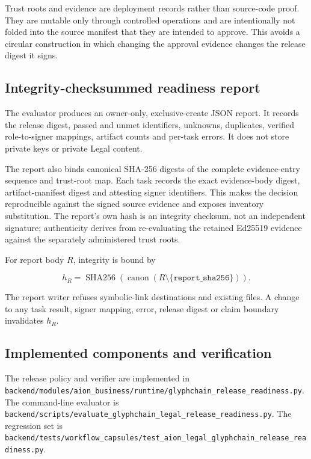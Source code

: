Trust roots and evidence are deployment records rather than source-code proof.
They are mutable only through controlled operations and are intentionally not
folded into the source manifest that they are intended to approve.  This avoids
a circular construction in which changing the approval evidence changes the
release digest it signs.

\subsection{Integrity-checksummed readiness report}

The evaluator produces an owner-only, exclusive-create JSON report.  It records
the release digest, passed and unmet identifiers, unknowns, duplicates,
verified role-to-signer mappings, artifact counts and per-task errors.  It does
not store private keys or private Legal content.

The report also binds canonical SHA-256 digests of the complete evidence-entry
sequence and trust-root map.  Each task records the exact evidence-body digest,
artifact-manifest digest and attesting signer identifiers.  This makes the
decision reproducible against the signed source evidence and exposes inventory
substitution.  The report's own hash is an integrity checksum, not an independent
signature; authenticity derives from re-evaluating the retained Ed25519 evidence
against the separately administered trust roots.

For report body $R$, integrity is bound by

\begin{equation}
  h_R = \operatorname{SHA256}\!\left(
    \operatorname{canon}(R \setminus \{\texttt{report\_sha256}\})
  \right).
\end{equation}

The report writer refuses symbolic-link destinations and existing files.  A
change to any task result, signer mapping, error, release digest or claim
boundary invalidates $h_R$.

\subsection{Implemented components and verification}

The release policy and verifier are implemented in
\texttt{backend/modules/aion\_business/runtime/glyphchain\_release\_readiness.py}.
The command-line evaluator is
\texttt{backend/scripts/evaluate\_glyphchain\_legal\_release\_readiness.py}.
The regression set is
\texttt{backend/tests/workflow\_capsules/test\_aion\_legal\_glyphchain\_release\_readiness.py}.

